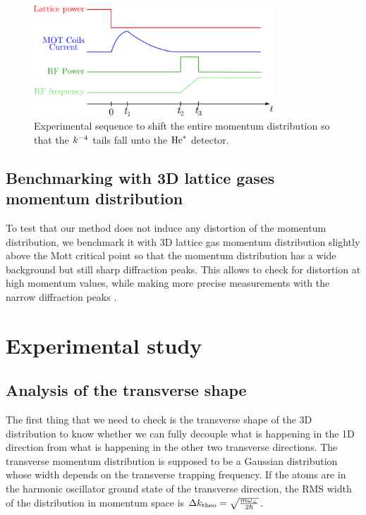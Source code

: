 \begin{figure}
    \centering
    \includegraphics[width=0.8\textwidth]{Fig/Chapter5/displacement_sequence.png}
    \caption{Experimental sequence to shift the entire momentum distribution so that the $k^{-4}$ tails fall unto the $\mathrm{He}^*$ detector.}
    \label{fig:displacement_sequence}
\end{figure}

\subsection{Benchmarking with 3D lattice gases momentum distribution}

To test that our method does not induce any distortion of the momentum distribution, we benchmark it with 3D lattice gas momentum distribution slightly above the Mott critical point so that the momentum distribution has a wide background but still sharp diffraction peaks. This allows to check for distortion at high momentum values, while making more precise measurements with the narrow diffraction peaks .





\section{Experimental study}

\subsection{Analysis of the transverse shape}

The first thing that we need to check is the transverse shape of the 3D distribution to know whether we can fully decouple what is happening in the 1D direction from what is happening in the other two transverse directions. The transverse momentum distribution is supposed to be a Gaussian distribution whose width depends on the transverse trapping frequency. If the atoms are in the harmonic oscillator ground state of the transverse direction, the RMS width of the distribution in momentum space is $\Delta k_{\rm{theo}}=\sqrt{\frac{m \omega_{\perp}}{2 \hbar}}$. 
